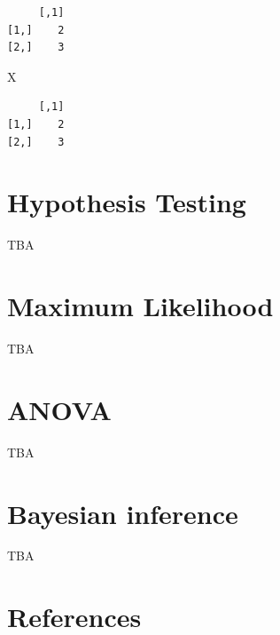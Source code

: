\documentclass[
  letterpaper,
  DIV=11,
  numbers=noendperiod]{scrreprt}
\newenvironment{Shaded}{\begin{snugshade}}{\end{snugshade}}
\newcommand{\NormalTok}[1]{\textcolor[rgb]{0.00,0.23,0.31}{#1}}
\begin{document}
\begin{verbatim}
     [,1]
[1,]    2
[2,]    3
\end{verbatim}

\begin{Shaded}
\begin{Highlighting}[]
\NormalTok{X}
\end{Highlighting}
\end{Shaded}

\begin{verbatim}
     [,1]
[1,]    2
[2,]    3
\end{verbatim}


\hypertarget{sec-hypothesis}{%
\chapter{Hypothesis Testing}\label{sec-hypothesis}}

TBA


\hypertarget{sec-max-lik}{%
\chapter{Maximum Likelihood}\label{sec-max-lik}}

TBA


\hypertarget{sec-anova}{%
\chapter{ANOVA}\label{sec-anova}}

TBA


\hypertarget{sec-bayesian}{%
\chapter{Bayesian inference}\label{sec-bayesian}}

TBA


\hypertarget{references}{%
\chapter*{References}\label{references}}

\end{document}
